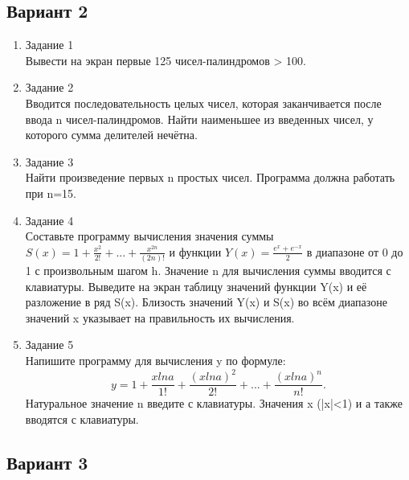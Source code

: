 \documentclass[a4paper]{article}
\begin{document}
\newpage
	\begin{center}
		\subsection*{Вариант 2}
	\end{center}


	\begin{enumerate} 
		\item Задание 1 \\
			Вывести на экран первые 125 чисел-палиндромов > 100.\\
		\item Задание 2\\
			Вводится последовательность целых чисел, которая заканчивается после ввода n чисел-палиндромов.
			Найти наименьшее из введенных чисел, у которого сумма делителей нечётна.\\
		\item Задание 3 \\
			Найти произведение первых n простых чисел. Программа должна работать при n=15.\\
		\item Задание 4 \\
			Составьте программу вычисления значения суммы  $S(x)=1+\frac{x^2}{2!}+...+\frac{x^{2n}}{(2n)!}$
			и функции $Y(x)=\frac{e^x+e^{-x}}{2}$ в диапазоне от 0 до 1
			с произвольным шагом h. Значение n для вычисления суммы вводится с клавиатуры. Выведите на экран таблицу значений функции Y(x) и её разложение в ряд S(x). Близость значений Y(x) и S(x) во всём диапазоне
			значений x указывает на правильность их вычисления.\\
		\item Задание 5 \\
			Напишите программу для вычисления y по формуле:
			$$y=1+\frac{xlna}{1!}+\frac{(xlna)^2}{2!}+...+\frac{(xlna)^n}{n!}.$$
			Натуральное значение n введите с клавиатуры. Значения x (|x|<1) и а также вводятся с клавиатуры.\\
	\end{enumerate}
\newpage
	\begin{center}
		\subsection*{Вариант 3}
	\end{center}
\end{document}
